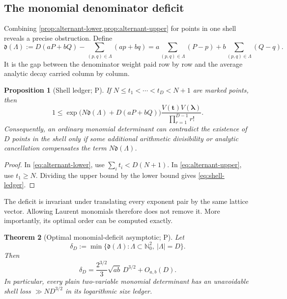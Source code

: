 \documentclass[10pt,oneside]{article}
\newtheorem{theorem}{Theorem}[section]
\newtheorem{proposition}[theorem]{Proposition}
\theoremstyle{definition}
\theoremstyle{remark}
\newcommand{\Nzero}{\mathbb N_0}
\newcommand{\statusP}{\textsc{P}}
\begin{document}
\subsection{The monomial denominator deficit}
Combining \cref{prop:alternant-lower,prop:alternant-upper} for points in one shell reveals a precise obstruction.  Define
\begin{equation}
 \mathfrak d(\Lambda)
 :=D(aP+bQ)-\sum_{(p,q)\in\Lambda}(ap+bq)
 =a\sum_{(p,q)\in\Lambda}(P-p)
  +b\sum_{(p,q)\in\Lambda}(Q-q).
\label{eq:deficit}
\end{equation}
It is the gap between the denominator weight paid row by row and the average analytic decay carried column by column.

\begin{proposition}[Shell ledger; \statusP]
\label{prop:shell-ledger}
If \(N\le t_1<\cdots<t_D<N+1\) are marked points, then
\begin{equation}
 1\le
 \exp\!\bigl(N\mathfrak d(\Lambda)+D(aP+bQ)\bigr)
 \frac{V(\bm t)V(\bm\lambda)}{\prod_{r=1}^{D-1}r!}.
\label{eq:shell-ledger}
\end{equation}
Consequently, an ordinary monomial determinant can contradict the existence of \(D\) points in the shell only if some additional arithmetic divisibility or analytic cancellation compensates the term \(N\mathfrak d(\Lambda)\).
\end{proposition}

\begin{proof}
In \eqref{eq:alternant-lower}, use
\(\sum_i t_i<D(N+1)\).  In \eqref{eq:alternant-upper}, use \(t_1\ge N\).  Dividing the upper bound by the lower bound gives \eqref{eq:shell-ledger}.
\end{proof}

The deficit is invariant under translating every exponent pair by the same lattice vector.  Allowing Laurent monomials therefore does not remove it.  More importantly, its optimal order can be computed exactly.

\begin{theorem}[Optimal monomial-deficit asymptotic; \statusP]
\label{thm:deficit-asymptotic}
Let
\[
 \delta_D:=\min\{\mathfrak d(\Lambda):
       \Lambda\subset\Nzero^2,\ |\Lambda|=D\}.
\]
Then
\begin{equation}
 \delta_D=\frac{2^{3/2}}{3}\sqrt{ab}\,D^{3/2}+O_{a,b}(D).
\label{eq:deficit-asymptotic}
\end{equation}
In particular, every plain two-variable monomial determinant has an unavoidable shell loss \(\gg ND^{3/2}\) in its logarithmic size ledger.
\end{theorem}
\end{document}
